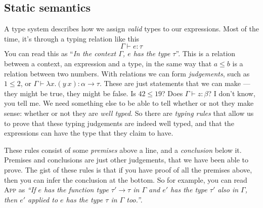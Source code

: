 

\subsection{Static semantics}

A type system describes how we assign \emph{valid} types to our
expressions. Most of the time, it's through a typing relation like this
\[ \Gamma \vdash e : \tau \]
You can read this as ``\textit{In the context
  $\Gamma$, $e$ has the type $\tau$}''. This is a relation between a context,
an expression and a type, in the same way that $a \leq b$ is a relation
between two numbers. With relations we can form \textit{judgements},
such as ${1 \leq 2}$, or
${\Gamma \vdash \lambda x . (y \ x) : \alpha \rightarrow \tau}$.  These are just statements that we can
make --- they might be true, they might be false. Is $42 \leq 19$? Does
${\Gamma \vdash z : \beta}$? I don't know, you tell me. We need something else to be
able to tell whether or not they make sense: whether or not they are
\textit{well typed}. So there are \emph{typing rules} that allow us to
prove that these typing judgements are indeed well typed, and that the
expressions can have the type that they claim to have.
These rules consist of some \emph{premises} above a line, and a
\emph{conclusion} below it. Premises and conclusions are just other
judgements, that we have been able to prove.
The gist of these rules is that if you have proof of all the premises
above, then you can infer the conclusion at the bottom. So for example, you
can read \textsc{App} as \textsl{``If $e$ has the function type $\tau' \rightarrow \tau$
  in $\Gamma$ and $e'$ has the type $\tau'$ also in $\Gamma$, then $e'$ applied to
  $e$ has the type $\tau$ in $\Gamma$ too.''}.

